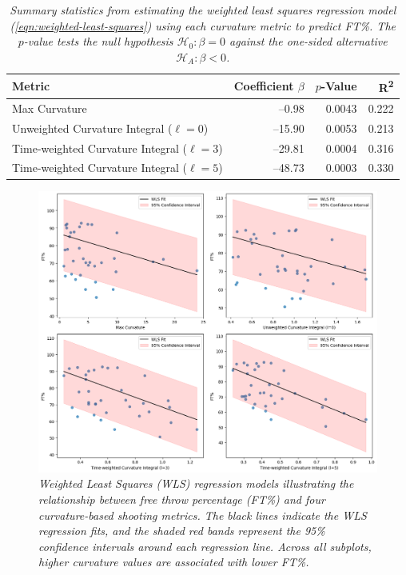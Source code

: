 \documentclass{article}
\begin{document}
    \begin{table}[H]
        \centering
        \begin{tabular}{lrrr}
        \toprule
        \textbf{Metric} & \textbf{Coefficient} $\beta$ & $p$-\textbf{Value} & \textbf{R\textsuperscript{2}}\\
        \midrule
        Max Curvature                               &   --0.98  & 0.0043  & 0.222 \\
        Unweighted Curvature Integral ($\ell=0$)    &  --15.90  & 0.0053  & 0.213 \\
        Time-weighted Curvature Integral ($\ell=3$) &  --29.81  & 0.0004  & 0.316 \\
        Time-weighted Curvature Integral ($\ell=5$) &  --48.73  & 0.0003  & 0.330 \\
        \bottomrule
        \end{tabular}
        \caption{\it Summary statistics from estimating the weighted least squares regression model (\ref{eqn:weighted-least-squares}) using each curvature metric to predict FT\%. The $p$-value tests the null hypothesis $\mathcal{H}_0 : \beta = 0$ against the one-sided alternative $\mathcal{H}_A : \beta < 0$.}
        \label{tab:wls-results}
    \end{table}

    \begin{figure}[H]
        \centering
        \includegraphics[width=0.6\linewidth]{reports/arxiv/regressionlines.png}
        \caption{\it Weighted Least Squares (WLS) regression models illustrating the relationship between free throw percentage (FT\%) and four curvature-based shooting metrics. The black lines indicate the WLS regression fits, and the shaded red bands represent the 95\% confidence intervals around each regression line. Across all subplots, higher curvature values are associated with lower FT\%.}
        \label{fig:scattered}
    \end{figure}
\end{document}
